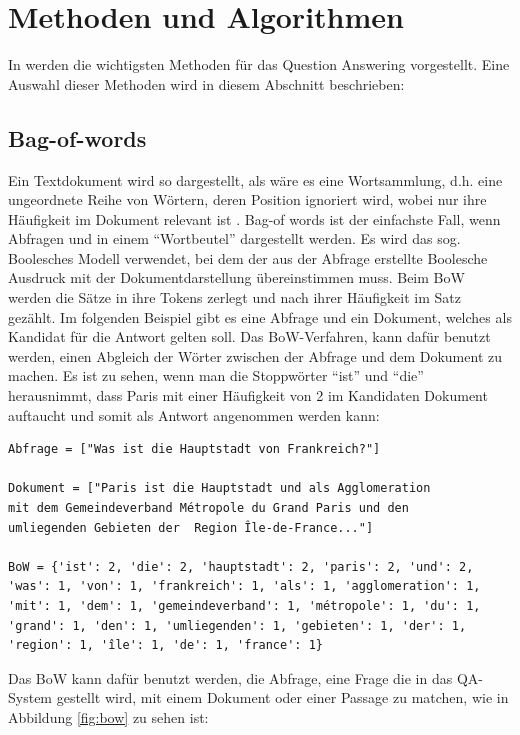 \documentclass[
        ngerman,
        paper=a4,
        numbers=noendperiod,
]{scrreprt}
\begin{document}
\section{Methoden und Algorithmen}
In \citep [S. 5418 - 5427]{Kolomiyets2011APerspective} werden die wichtigsten Methoden für das Question Answering vorgestellt. Eine Auswahl dieser Methoden wird in diesem Abschnitt beschrieben:
\subsection{Bag-of-words}

    
Ein Textdokument wird so dargestellt, als wäre es eine Wortsammlung, d.h. eine ungeordnete Reihe von Wörtern, deren Position ignoriert wird, wobei nur ihre Häufigkeit im Dokument relevant ist \citep [S. 58]{Jurafsky2014SpeechProcessing}. 
Bag-of words ist der einfachste Fall, wenn Abfragen und in einem \enquote{Wortbeutel} dargestellt werden.
Es wird das sog. Boolesches Modell verwendet, bei dem der aus der Abfrage erstellte Boolesche Ausdruck mit der Dokumentdarstellung übereinstimmen muss. Beim BoW werden die Sätze in ihre Tokens zerlegt und nach ihrer Häufigkeit im Satz gezählt. Im folgenden Beispiel gibt es eine Abfrage und ein Dokument, welches als Kandidat für die Antwort gelten soll. Das BoW-Verfahren, kann dafür benutzt werden, einen Abgleich der Wörter zwischen der Abfrage und dem Dokument zu machen. Es ist zu sehen, wenn man die Stoppwörter \enquote{ist} und \enquote{die} herausnimmt, dass Paris mit einer Häufigkeit von 2 im Kandidaten Dokument auftaucht und somit als Antwort angenommen werden kann:

\begin{verbatim}
Abfrage = ["Was ist die Hauptstadt von Frankreich?"]

Dokument = ["Paris ist die Hauptstadt und als Agglomeration 
mit dem Gemeindeverband Métropole du Grand Paris und den 
umliegenden Gebieten der  Region Île-de-France..."]

BoW = {'ist': 2, 'die': 2, 'hauptstadt': 2, 'paris': 2, 'und': 2, 
'was': 1, 'von': 1, 'frankreich': 1, 'als': 1, 'agglomeration': 1, 
'mit': 1, 'dem': 1, 'gemeindeverband': 1, 'métropole': 1, 'du': 1, 
'grand': 1, 'den': 1, 'umliegenden': 1, 'gebieten': 1, 'der': 1, 
'region': 1, 'île': 1, 'de': 1, 'france': 1}
\end{verbatim}

Das BoW kann dafür benutzt werden, die Abfrage, eine Frage die in das QA-System gestellt wird, mit einem Dokument oder einer Passage zu matchen, wie in Abbildung \ref{fig:bow} zu sehen ist: 
\end{document}
